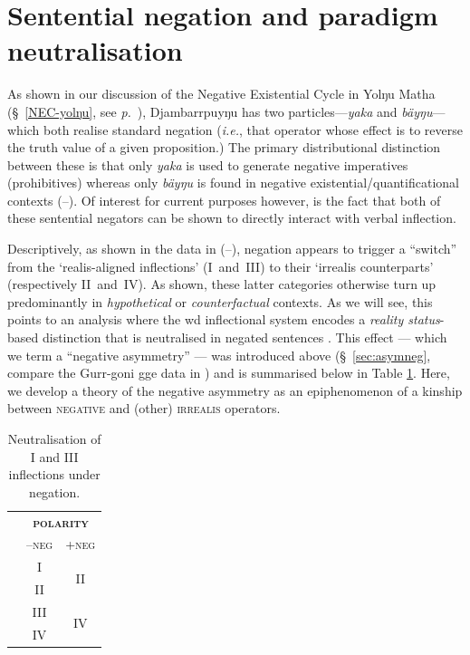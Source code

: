 \section{Sentential negation and paradigm neutralisation}\label{sec:negs}

As shown in our discussion of the Negative Existential Cycle in Yolŋu Matha (\S~\ref{NEC-yolŋu}, see \textit{p.}~\pageref{sec:nec-djr}), Djambarrpuyŋu has two particles---\textit{yaka} and \textit{bäyŋu}---which both realise standard negation (\textit{i.e.}, that operator whose effect is to reverse the truth value of a given proposition.) The primary distributional distinction between these is that only \textit{yaka} is used to generate negative imperatives (prohibitives) whereas only \textit{bäyŋu} is found in negative existential/quantificational contexts (--). Of interest for current purposes however, is the fact that both of these sentential negators can be shown to directly interact with verbal inflection.


Descriptively, as shown in the data in (--), negation appears to trigger a ``switch'' from the `realis-aligned inflections' (\gls{I}~and~\gls{III}) to their `irrealis counterparts' (respectively \gls{II}~and~\gls{IV}). As shown, these latter categories otherwise turn up predominantly in \textit{hypothetical} or \textit{counterfactual} contexts. As we will see, this points to an analysis where the \acrlong{wd} inflectional system encodes a \textit{reality status}-based distinction that is neutralised in negated sentences \citep[see also discussion in][356]{Wilkinson1991}. This effect --- which we term a ``negative asymmetry'' \citep[specifically \acrshort{anr}, following][]{Miestamo2005} --- was introduced above (\S~\ref{sec:asymneg}, compare the Gurr-goni \gls{gge} data in )  and is summarised below in Table \ref{tab:negneut}. Here, we develop a theory of the negative asymmetry as an epiphenomenon of a kinship between \textsc{negative} and (other) \textsc{irrealis} operators.

\begin{table}[h]\centering
	\begin{tabular}{ccc}
		&\multicolumn{2}{c}{\textsc{\textbf{polarity}}} \\
		& \textsc{--neg} & \textsc{+neg}\\\midrule
		&	\gls{I} & \multirow{2}{*}{\gls{II}}\\
		& \gls{II} \\\midrule
		&	\gls{III} & \multirow{2}{*}{\gls{IV}}\\
		& \gls{IV} \\\bottomrule
	\end{tabular}
	\caption{Neutralisation of \gls{I} and \gls{III} inflections under negation.}\label{tab:negneut}
\end{table}


